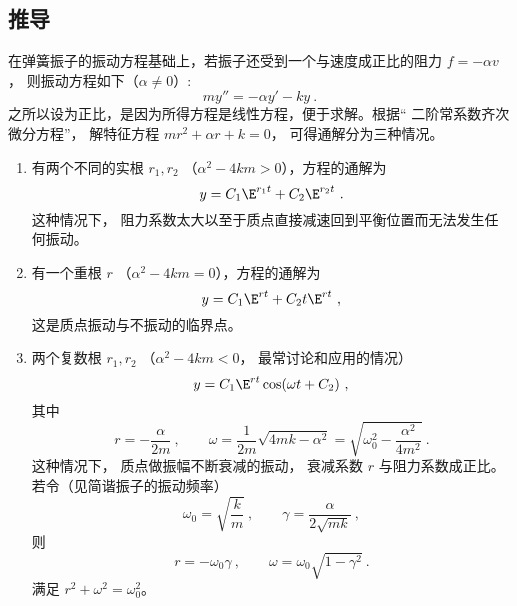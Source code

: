 \subsection{推导}
在弹簧振子的振动方程基础上，若振子还受到一个与速度成正比的阻力 $f =  - \alpha v$， 则振动方程如下（$\alpha \ne 0$）:
\begin{equation}
my'' =  - \alpha y' - ky~.
\end{equation}
之所以设为正比，是因为所得方程是线性方程，便于求解。根据“ 二阶常系数齐次微分方程”， 解特征方程 $m r^2 + \alpha r + k = 0$， 可得通解分为三种情况。
\begin{enumerate}
\item 有两个不同的实根 $r_1, r_2$ （$\alpha ^2 - 4km > 0$），方程的通解为
\begin{equation}
y = C_1 \E^{r_1 t} + C_2 \E^{r_2 t}~.
\end{equation}
这种情况下， 阻力系数太大以至于质点直接减速回到平衡位置而无法发生任何振动。

\item 有一个重根 $r$ （$\alpha ^2 - 4km = 0$），方程的通解为
\begin{equation}
y = C_1 \E^{rt} + C_2 t \E^{rt}~,
\end{equation}
这是质点振动与不振动的临界点。

\item 两个复数根 $r_1,r_2$ （$\alpha ^2 - 4km < 0$， 最常讨论和应用的情况）
\begin{equation}
y = C_1 \E^{rt}\cos(\omega t + C_2)~,
\end{equation}
其中
\begin{equation}
r =  - \frac{\alpha }{2m}~,
\qquad
\omega = \frac{1}{2m}\sqrt {4mk - \alpha ^2}  = \sqrt{\omega_0^2 - \frac{\alpha ^2}{4 m^2}}~.
\end{equation}
这种情况下， 质点做振幅不断衰减的振动， 衰减系数 $r$ 与阻力系数成正比。 若令（见简谐振子的振动频率）
\begin{equation}
\omega_0 = \sqrt{\frac{k}{m}}~, \qquad \gamma  = \frac{\alpha }{2\sqrt{mk}}~,
\end{equation}
则 
\begin{equation}
r =  - \omega_0 \gamma~,\qquad \omega  = \omega_0 \sqrt{1 - \gamma ^2}~.
\end{equation}
满足
$r^2 + \omega ^2 = \omega_0^2$。
\end{enumerate}



